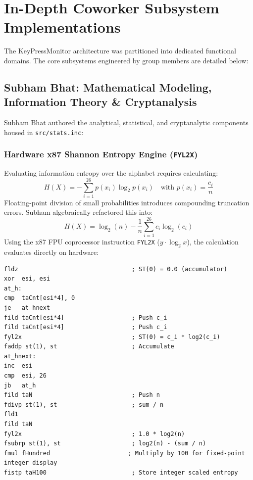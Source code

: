 \documentclass[11pt,a4paper]{article}
\begin{document}
\section{In-Depth Coworker Subsystem Implementations}

The KeyPressMonitor architecture was partitioned into dedicated functional domains. The core subsystems engineered by group members are detailed below:

\subsection{Subham Bhat: Mathematical Modeling, Information Theory \& Cryptanalysis}
Subham Bhat authored the analytical, statistical, and cryptanalytic components housed in \texttt{src/stats.inc}:

\subsubsection{Hardware x87 Shannon Entropy Engine (\texttt{FYL2X})}
Evaluating information entropy over the alphabet requires calculating:
\begin{equation}
  H(X) = -\sum_{i=1}^{26} p(x_i) \log_2 p(x_i) \quad \text{with } p(x_i) = \frac{c_i}{n}
\end{equation}
Floating-point division of small probabilities introduces compounding truncation errors. Subham algebraically refactored this into:
\begin{equation}
  H(X) = \log_2(n) - \frac{1}{n}\sum_{i=1}^{26} c_i \log_2(c_i)
\end{equation}
Using the x87 FPU coprocessor instruction \texttt{FYL2X} ($y \cdot \log_2 x$), the calculation evaluates directly on hardware:
\begin{lstlisting}[language={[x86masm]Assembler}]
fldz                                ; ST(0) = 0.0 (accumulator)
xor  esi, esi
at_h:
cmp  taCnt[esi*4], 0
je   at_hnext
fild taCnt[esi*4]                   ; Push c_i
fild taCnt[esi*4]                   ; Push c_i
fyl2x                               ; ST(0) = c_i * log2(c_i)
faddp st(1), st                     ; Accumulate
at_hnext:
inc  esi
cmp  esi, 26
jb   at_h
fild taN                            ; Push n
fdivp st(1), st                     ; sum / n
fld1
fild taN
fyl2x                               ; 1.0 * log2(n)
fsubrp st(1), st                    ; log2(n) - (sum / n)
fmul fHundred                      ; Multiply by 100 for fixed-point integer display
fistp taH100                        ; Store integer scaled entropy
\end{lstlisting}
\end{document}
